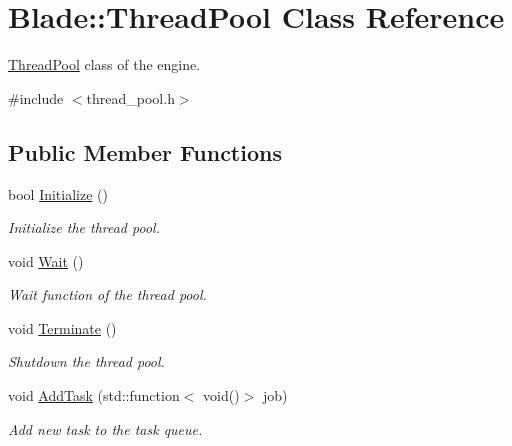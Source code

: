 \hypertarget{class_blade_1_1_thread_pool}{}\section{Blade\+:\+:Thread\+Pool Class Reference}
\label{class_blade_1_1_thread_pool}


\hyperlink{class_blade_1_1_thread_pool}{Thread\+Pool} class of the engine.  




{\ttfamily \#include $<$thread\+\_\+pool.\+h$>$}

\subsection*{Public Member Functions}
\begin{DoxyCompactItemize}
\item 
bool \hyperlink{class_blade_1_1_thread_pool_a47f7b1929e59c4be260f1616a7340ca7}{Initialize} ()
\begin{DoxyCompactList}\small\item\em Initialize the thread pool. \end{DoxyCompactList}\item 
\mbox{\label{class_blade_1_1_thread_pool_af4d1c27beaf4747690dae01a00f9037b}} 
void \hyperlink{class_blade_1_1_thread_pool_af4d1c27beaf4747690dae01a00f9037b}{Wait} ()
\begin{DoxyCompactList}\small\item\em Wait function of the thread pool. \end{DoxyCompactList}\item 
\mbox{\label{class_blade_1_1_thread_pool_a5ed5801d197bac182a28e2d430007db0}} 
void \hyperlink{class_blade_1_1_thread_pool_a5ed5801d197bac182a28e2d430007db0}{Terminate} ()
\begin{DoxyCompactList}\small\item\em Shutdown the thread pool. \end{DoxyCompactList}\item 
void \hyperlink{class_blade_1_1_thread_pool_acc1d6c39383a95582641b5b34d44040c}{Add\+Task} (std\+::function$<$ void()$>$ job)
\begin{DoxyCompactList}\small\item\em Add new task to the task queue. \end{DoxyCompactList}\item 

\end{DoxyCompactItemize}
